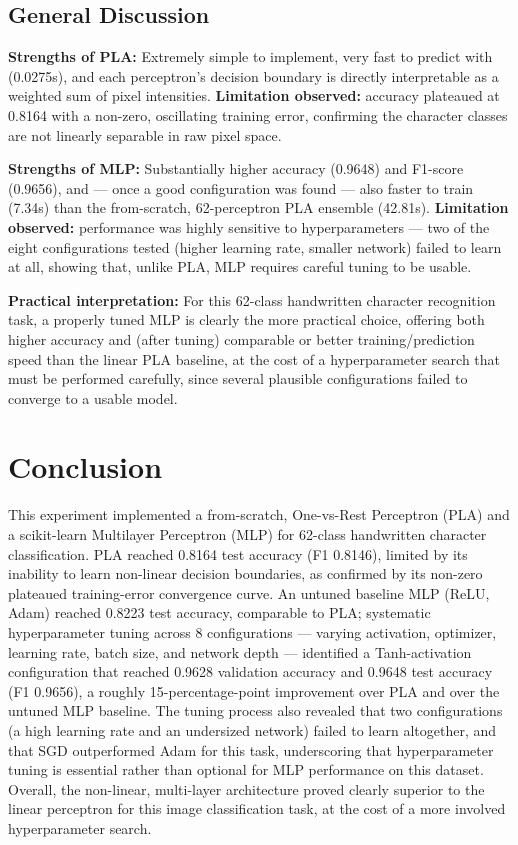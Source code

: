 \documentclass[12pt,a4paper]{article}
\begin{document}
\subsection{General Discussion}
\textbf{Strengths of PLA:} Extremely simple to implement, very fast to predict with
(0.0275s), and each perceptron's decision boundary is directly interpretable as a weighted sum of
pixel intensities.
\textbf{Limitation observed:} accuracy plateaued at 0.8164 with a non-zero, oscillating training
error, confirming the character classes are not linearly separable in raw pixel space.

\textbf{Strengths of MLP:} Substantially higher accuracy (0.9648) and F1-score (0.9656), and —
once a good configuration was found — also faster to train (7.34s) than the from-scratch,
62-perceptron PLA ensemble (42.81s).
\textbf{Limitation observed:} performance was highly sensitive to hyperparameters — two of the
eight configurations tested (higher learning rate, smaller network) failed to learn at all,
showing that, unlike PLA, MLP requires careful tuning to be usable.

\textbf{Practical interpretation:} For this 62-class handwritten character recognition task, a
properly tuned MLP is clearly the more practical choice, offering both higher accuracy and (after
tuning) comparable or better training/prediction speed than the linear PLA baseline, at the cost
of a hyperparameter search that must be performed carefully, since several plausible
configurations failed to converge to a usable model.

\section{Conclusion}
This experiment implemented a from-scratch, One-vs-Rest Perceptron (PLA) and a scikit-learn
Multilayer Perceptron (MLP) for 62-class handwritten character classification. PLA reached
0.8164 test accuracy (F1 0.8146), limited by its inability to learn non-linear decision
boundaries, as confirmed by its non-zero plateaued training-error convergence curve. An untuned
baseline MLP (ReLU, Adam) reached 0.8223 test accuracy, comparable to PLA; systematic
hyperparameter tuning across 8 configurations — varying activation, optimizer, learning rate,
batch size, and network depth — identified a Tanh-activation configuration that reached 0.9628
validation accuracy and 0.9648 test accuracy (F1 0.9656), a roughly 15-percentage-point
improvement over PLA and over the untuned MLP baseline. The tuning process also revealed that
two configurations (a high learning rate and an undersized network) failed to learn altogether,
and that SGD outperformed Adam for this task, underscoring that hyperparameter tuning is
essential rather than optional for MLP performance on this dataset. Overall, the non-linear,
multi-layer architecture proved clearly superior to the linear perceptron for this image
classification task, at the cost of a more involved hyperparameter search.
\end{document}
